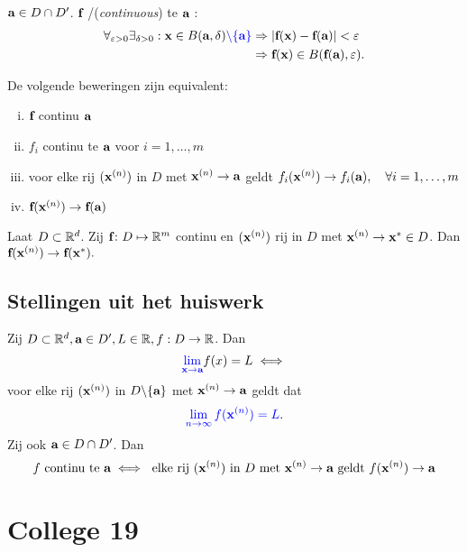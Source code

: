\documentclass{2wa40summary}
\begin{document}
		  ${\textbf{a}} \in D \cap D'$.
		   ${\textbf{f}}$ /(\textit{continuous}) te ${\textbf{a}}$ :
		\begin{align*}
			\forall _{\varepsilon >0} \exists _{\delta >0}: {\textbf{x}}\in B({\textbf{a}},\delta){\color{blue}\backslash\lbrace{\textbf{a}}\rbrace} &\Rightarrow |{\textbf{f}}({\textbf{x}})-{\textbf{f}}({\textbf{a}})|<\varepsilon \\
			&\Rightarrow {\textbf{f}}({\textbf{x}}) \in B({\textbf{f}}({\textbf{a}}),\varepsilon).
		\end{align*}
		
		 De volgende beweringen zijn equivalent: 
			\begin{enumerate}[(i)]
				\item ${\textbf{f}}$ continu  ${\textbf{a}}$
				\item $f_i$ continu te ${\textbf{a}}$ voor $i=1,\ldots,m$
				\item voor elke rij $({\textbf{x}}^{(n)})$ in $D$ met ${\textbf{x}}^{(n)}\to{\textbf{a}}$ geldt $f_i({\textbf{x}}^{(n)}) \to f_i({\textbf{a}}),\quad\forall i=1,\ldots,m$
                                \item {} ${\textbf{f}}({\textbf{x}}^{(n)})\to{\textbf{f}}({\textbf{a}})$
			\end{enumerate}
		
		Laat $D \subset \mathbb{R}^d$. 
			\opm Zij ${\textbf{f}}\colon D\mapsto \mathbb{R}^m$ continu en $({\textbf{x}}^{(n)})$ rij in $D$ met ${\textbf{x}}^{(n)} \to {\textbf{x}}^* \in D$.
			  Dan ${\textbf{f}}({\textbf{x}}^{(n)}) \to {\textbf{f}}({\textbf{x}}^*).$
\subsection{Stellingen uit het huiswerk}
\theorem Zij $D \subset \mathbb{R}^d, {\textbf{a}} \in D', L \in \mathbb{R}, f:D \rightarrow \mathbb{R}$. Dan
\[
{\color{blue}\lim_{{\textbf{x}}\to{\textbf{a}}}}f(x)=L \iff
\]
voor elke rij $({\textbf{x}}^{(n)})$ in $D\backslash\lbrace{\textbf{a}}\rbrace$ met ${\textbf{x}}^{(n)}\to{\textbf{a}}$ geldt dat
\[
{\color{blue}\lim_{n\to\infty} f({\textbf{x}}^{(n)}) = L}.
\]
Zij ook ${\textbf{a}} \in D \cap D'$. Dan
            \[f \text{ continu te } {\textbf{a}} \iff \text{ elke rij }({\textbf{x}}^{(n)}) \text{ in } D \text{ met } {\textbf{x}}^{(n)}\to{\textbf{a}} \text{ geldt } f({\textbf{x}}^{(n)}) \to{\textbf{a}}\]

\newpage
\section{College 19}
\end{document}
